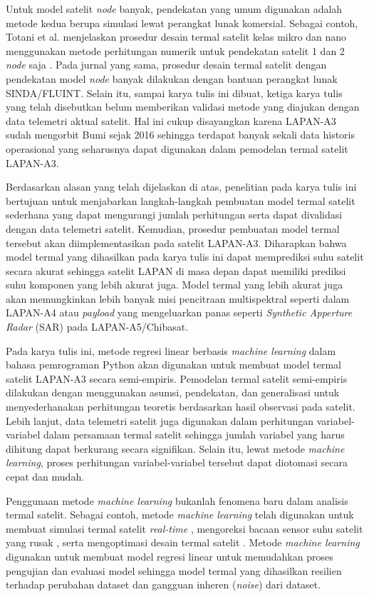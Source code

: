 Untuk model satelit \textit{node} banyak, pendekatan yang umum digunakan adalah
metode kedua berupa simulasi lewat perangkat lunak komersial. Sebagai contoh,
Totani et al. menjelaskan prosedur desain termal satelit kelas mikro dan nano
menggunakan metode perhitungan numerik untuk pendekatan satelit 1 dan 2
\textit{node} saja \cite{totani2014}. Pada jurnal yang sama, prosedur
desain termal satelit dengan pendekatan model \textit{node} banyak dilakukan
dengan bantuan perangkat lunak SINDA/FLUINT. Selain itu, sampai karya tulis ini
dibuat, ketiga karya tulis yang telah disebutkan belum memberikan validasi
metode yang diajukan dengan data telemetri aktual satelit. Hal ini cukup
disayangkan karena LAPAN-A3 sudah mengorbit Bumi sejak 2016 sehingga terdapat
banyak sekali data historis operasional yang seharusnya dapat digunakan dalam
pemodelan termal satelit LAPAN-A3.

Berdasarkan alasan yang telah dijelaskan di atas, penelitian pada karya tulis
ini bertujuan untuk menjabarkan langkah-langkah pembuatan model termal satelit
sederhana yang dapat mengurangi jumlah perhitungan serta dapat divalidasi
dengan data telemetri satelit. Kemudian, prosedur pembuatan model termal
tersebut akan diimplementasikan pada satelit LAPAN-A3. Diharapkan bahwa model
termal yang dihasilkan pada karya tulis ini dapat memprediksi suhu satelit
secara akurat sehingga satelit LAPAN di masa depan dapat memiliki prediksi suhu
komponen yang lebih akurat juga. Model termal yang lebih akurat juga akan
memungkinkan lebih banyak misi pencitraan multispektral seperti dalam LAPAN-A4
atau \textit{payload} yang mengeluarkan panas seperti \textit{Synthetic
Apperture Radar} (SAR) pada LAPAN-A5/Chibasat.

Pada karya tulis ini, metode regresi linear berbasis \textit{machine learning}
dalam bahasa pemrograman Python akan digunakan untuk membuat model termal
satelit LAPAN-A3 secara semi-empiris. Pemodelan termal satelit semi-empiris
dilakukan dengan menggunakan asumsi, pendekatan, dan generalisasi untuk
menyederhanakan perhitungan teoretis berdasarkan hasil observasi pada satelit.
Lebih lanjut, data telemetri satelit juga digunakan dalam perhitungan
variabel-variabel dalam persamaan termal satelit sehingga jumlah variabel yang
harus dihitung dapat berkurang secara signifikan. Selain itu, lewat metode
\textit{machine learning}, proses perhitungan variabel-variabel tersebut dapat
diotomasi secara cepat dan mudah.

Penggunaan metode \textit{machine learning} bukanlah fenomena baru dalam
analisis termal satelit. Sebagai contoh, metode \textit{machine learning} telah
digunakan untuk membuat simulasi termal satelit \textit{real-time}
\cite{junior2017}, mengoreksi bacaan sensor suhu satelit yang rusak
\cite{abdelkhalek2019}, serta mengoptimasi desain termal satelit
\cite{xiong2020}. Metode \textit{machine learning} digunakan untuk membuat
model regresi linear untuk memudahkan proses pengujian dan evaluasi model
sehingga model termal yang dihasilkan resilien terhadap perubahan dataset dan
gangguan inheren (\textit{noise}) dari dataset.


